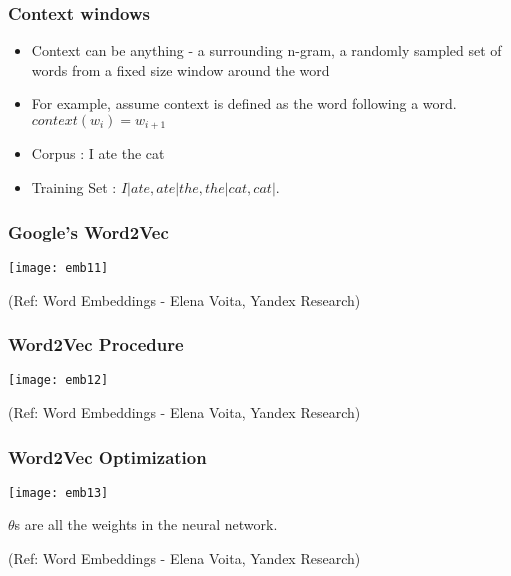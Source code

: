 

\begin{frame}[fragile]\frametitle{Context windows}
\begin{itemize}
\item Context can be anything - a surrounding n-gram, a randomly sampled set of words from a fixed size window around the word
\item For example, assume context is defined as the word following a word. $context(w_i) = w_{i+1}$
\item Corpus :  I ate the cat
\item Training Set  : $I|ate,  ate|the ,  the|cat, cat|. $
\end{itemize}
\end{frame}


\begin{frame}[fragile]\frametitle{Google's Word2Vec}
\begin{center}
\texttt{[image: emb11]}
\end{center}

{\tiny (Ref: Word Embeddings - Elena Voita, Yandex Research)}
\end{frame}

\begin{frame}[fragile]\frametitle{Word2Vec Procedure}
\begin{center}
\texttt{[image: emb12]}
\end{center}

{\tiny (Ref: Word Embeddings - Elena Voita, Yandex Research)}
\end{frame}

\begin{frame}[fragile]\frametitle{Word2Vec Optimization}
\begin{center}
\texttt{[image: emb13]}
\end{center}

$\theta$s are all the weights in the neural network.

{\tiny (Ref: Word Embeddings - Elena Voita, Yandex Research)}
\end{frame}



